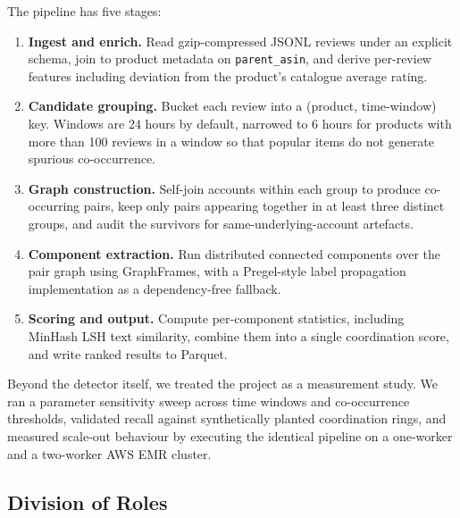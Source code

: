 \documentclass[12pt]{article}
\begin{document}
The pipeline has five stages:

\begin{enumerate}
  \item \textbf{Ingest and enrich.} Read gzip-compressed JSONL reviews under an
        explicit schema, join to product metadata on \texttt{parent\_asin},
        and derive per-review features including deviation from the product's
        catalogue average rating.
  \item \textbf{Candidate grouping.} Bucket each review into a
        (product, time-window) key. Windows are 24 hours by default, narrowed
        to 6 hours for products with more than 100 reviews in a window so that
        popular items do not generate spurious co-occurrence.
  \item \textbf{Graph construction.} Self-join accounts within each group to
        produce co-occurring pairs, keep only pairs appearing together in at
        least three distinct groups, and audit the survivors for
        same-underlying-account artefacts.
  \item \textbf{Component extraction.} Run distributed connected components
        over the pair graph using GraphFrames, with a Pregel-style label
        propagation implementation as a dependency-free fallback.
  \item \textbf{Scoring and output.} Compute per-component statistics,
        including MinHash LSH text similarity, combine them into a single
        coordination score, and write ranked results to Parquet.
\end{enumerate}

Beyond the detector itself, we treated the project as a measurement study. We
ran a parameter sensitivity sweep across time windows and co-occurrence
thresholds, validated recall against synthetically planted coordination rings,
and measured scale-out behaviour by executing the identical pipeline on a
one-worker and a two-worker AWS EMR cluster.

\subsection{Division of Roles}
\end{document}
